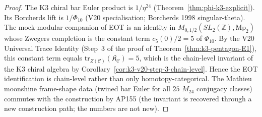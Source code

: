 \begin{proof}
The K$3$ chiral bar Euler product is $1/\eta^{24}$
\textup{(}Theorem~\ref{thm:phi-k3-explicit}\textup{).}  Its Borcherds
lift is $1/\Phi_{10}$ \textup{(}V20 specialisation; Borcherds 1998
singular-theta\textup{).}  The mock-modular companion of EOT is an
identity in $M_{0, 1/2}(SL_2(\mathbb{Z}), \mathrm{Mp}_2)$ whose
Zwegers completion is the constant term $c_5(0)/2 = 5$ of $\Phi_{10}$.
By the V20 Universal Trace Identity \textup{(}Step~3 of the proof of
Theorem~\ref{thm:k3-pentagon-E1}\textup{)}, this constant term equals
$\mathrm{tr}_{Z(\mathcal{C})}(\mathfrak{K}_{\mathcal{C}}) = 5$, which
is the chain-level invariant of the K$3$ chiral algebra by
Corollary~\ref{cor:k3-v20-step-3-chain-level}.  Hence the EOT
identification is chain-level rather than only homotopy-categorical.
The Mathieu moonshine frame-shape data \textup{(}twined bar Euler for
all $25$ $M_{24}$ conjugacy classes\textup{)} commutes with the
construction by AP155 \textup{(}the invariant is recovered through a
new construction path; the numbers are not new\textup{).}
\end{proof}

